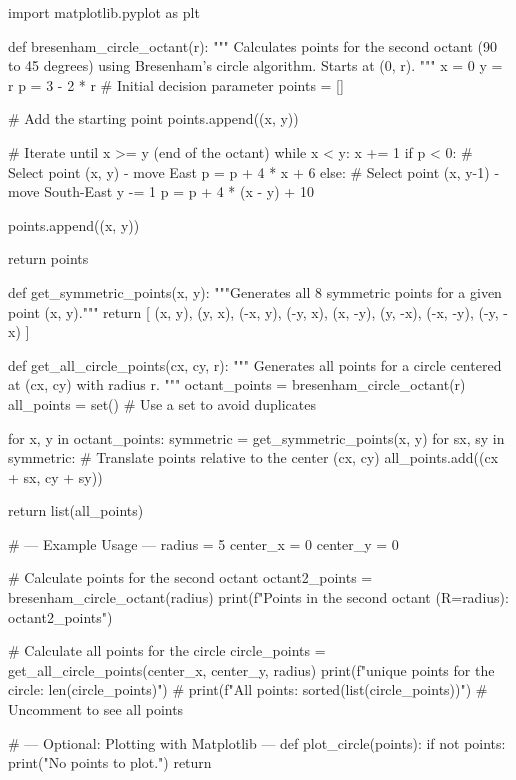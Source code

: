 \documentclass[12pt, a4paper]{article}
\begin{document}
\begin{pythoncode}
import matplotlib.pyplot as plt

def bresenham_circle_octant(r):
    """
    Calculates points for the second octant (90 to 45 degrees)
    using Bresenham's circle algorithm.
    Starts at (0, r).
    """
    x = 0
    y = r
    p = 3 - 2 * r  # Initial decision parameter
    points = []

    # Add the starting point
    points.append((x, y))

    # Iterate until x >= y (end of the octant)
    while x < y:
        x += 1
        if p < 0:
            # Select point (x, y) - move East
            p = p + 4 * x + 6
        else:
            # Select point (x, y-1) - move South-East
            y -= 1
            p = p + 4 * (x - y) + 10

        points.append((x, y))

    return points

def get_symmetric_points(x, y):
    """Generates all 8 symmetric points for a given point (x, y)."""
    return [
        (x, y), (y, x), (-x, y), (-y, x),
        (x, -y), (y, -x), (-x, -y), (-y, -x)
    ]

def get_all_circle_points(cx, cy, r):
    """
    Generates all points for a circle centered at (cx, cy) with radius r.
    """
    octant_points = bresenham_circle_octant(r)
    all_points = set() # Use a set to avoid duplicates

    for x, y in octant_points:
        symmetric = get_symmetric_points(x, y)
        for sx, sy in symmetric:
            # Translate points relative to the center (cx, cy)
            all_points.add((cx + sx, cy + sy))

    return list(all_points)

# --- Example Usage ---
radius = 5
center_x = 0
center_y = 0

# Calculate points for the second octant
octant2_points = bresenham_circle_octant(radius)
print(f"Points in the second octant (R={radius}): {octant2_points}")

# Calculate all points for the circle
circle_points = get_all_circle_points(center_x, center_y, radius)
print(f"\nTotal unique points for the circle: {len(circle_points)}")
# print(f"All points: {sorted(list(circle_points))}") # Uncomment to see all points

# --- Optional: Plotting with Matplotlib ---
def plot_circle(points):
    if not points:
        print("No points to plot.")
        return


\end{pythoncode}
\end{document}
